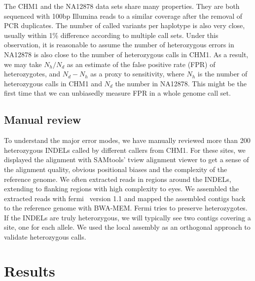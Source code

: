 \documentclass{bioinfo-ori}
\begin{document}
\begin{methods}
The CHM1 and the NA12878 data sets share many properties. They are both
sequenced with 100bp Illumina reads to a similar coverage after the removal of PCR
duplicates. The number of called variants per haplotype is also very close,
usually within 1\% difference according to multiple call sets. Under this
observation, it is reasonable to assume the number of heterozygous errors in
NA12878 is also close to the number of heterozygous calls in CHM1. As a result,
we may take $N_h/N_d$ as an estimate of the false positive rate (FPR) of
heterozygotes, and $N_d-N_h$ as a proxy to sensitivity, where $N_h$ is the
number of heterozygous calls in CHM1 and $N_d$ the number in NA12878. This
might be the first time that we can unbiasedly measure FPR
in a whole genome call set.

\subsection{Manual review}

To understand the major error modes, we have manually reviewed more than 200
heterozygous INDELs called by different callers from CHM1. For these sites,
we displayed the alignment with SAMtools' tview alignment viewer to get a sense
of the alignment quality, obvious positional biases and the complexity of the
reference genome. We often extracted reads in regions around the INDELs,
extending to flanking regions with high complexity to eyes. We assembled the
extracted reads with fermi~\citep{Li:2012fk} version 1.1 and mapped the
assembled contigs back to the reference genome with BWA-MEM. Fermi tries to
preserve heterozygotes. If the INDELs are truly heterozygous, we will typically
see two contigs covering a site, one for each allele. We used the local
assembly as an orthogonal approach to validate heterozygous calls.


\end{methods}

\section{Results}
\end{document}
